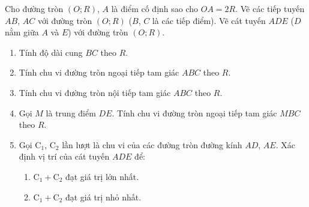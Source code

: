 \begin{bt}%
	Cho đường tròn $(O;R)$, $A$ là điểm cố định sao cho $OA=2R$. Vẽ các tiếp tuyến $AB$, $AC$ với đường tròn $(O;R)$ ($B$, $C$ là các tiếp điểm). Vẽ cát tuyến $ADE$ ($D$ nằm giữa $A$ và $E$) với đường tròn $(O;R)$.
	\begin{enumerate}
		\item Tính độ dài cung $BC$ theo $R$.
		\item Tính chu vi đường tròn ngoại tiếp tam giác $ABC$ theo $R$.
		\item Tính chu vi đường tròn nội tiếp tam giác $ABC$ theo $R$.
		\item Gọi $M$ là trung điểm $DE$. Tính chu vi đường tròn ngoại tiếp tam giác $MBC$ theo $R$.
		\item Gọi $\mathrm{C}_1$, $\mathrm{C}_2$ lần lượt là chu vi của các đường tròn đường kính $AD$, $AE$. Xác định vị trí của cát tuyến $ADE$ để:
		\begin{enumerate}
			\item $\mathrm{C}_1+\mathrm{C}_2$ đạt giá trị lớn nhất.
			\item $\mathrm{C}_1+\mathrm{C}_2$ đạt giá trị nhỏ nhất.
		\end{enumerate}	
	\end{enumerate}	
\end{bt}
